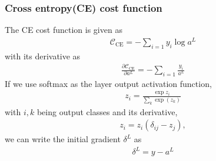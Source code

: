 \subsubsection{Cross entropy(CE) cost function}
The CE cost function is given as
\begin{align}
    \mathcal{C}_\mathrm{CE} = - \sum_{i=1} y_i \log a^L
    \label{eq:ce-mlp-cost}
\end{align}
with its derivative as 
\begin{align}
    \frac{\partial \mathcal{C}_\mathrm{CE}}{\partial a^L} = - \sum_{i=1} \frac{y_i} {a^L}
    \label{eq:ce-mlp-cost-der}
\end{align}
If we use softmax as the layer output activation function,
\begin{align}
    z_i = \frac{\exp{z_i}}{\sum_k \exp(z_k) }
    \label{eq:softmax}
\end{align}
with $i,k$ being output classes and its derivative,
\begin{align}
    z_i = z_i(\delta_{ij} - z_j),
\end{align}
we can write the initial gradient $\delta^L$ as
\begin{align}
    \delta^L = y - a^L
\end{align}

